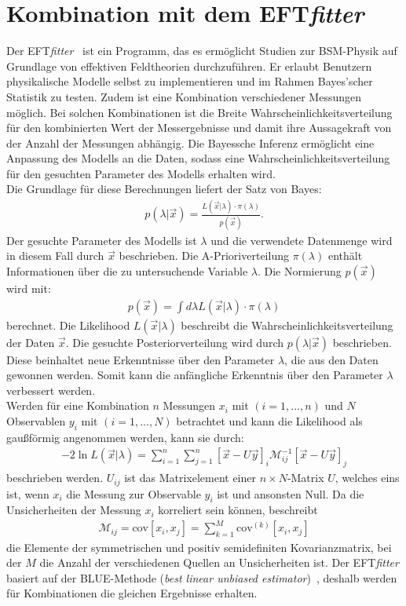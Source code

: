 \section{Kombination mit dem EFT\textit{fitter}}
Der EFT\textit{fitter}~\cite{Castro:2016jjv} ist ein Programm, das es ermöglicht Studien zur BSM-Physik auf Grundlage von effektiven Feldtheorien durchzuführen. Er erlaubt Benutzern physikalische Modelle selbst zu implementieren und im Rahmen Bayes'scher Statistik zu testen. Zudem ist eine Kombination verschiedener Messungen möglich. Bei solchen Kombinationen ist die Breite Wahrscheinlichkeitsverteilung für den kombinierten Wert der Messergebnisse und damit ihre Aussagekraft von der Anzahl der Messungen abhängig.
Die Bayessche Inferenz ermöglicht eine Anpassung des Modells an die Daten, sodass eine Wahrscheinlichkeitsverteilung für den gesuchten Parameter des Modells erhalten wird.\\
Die Grundlage für diese Berechnungen liefert der Satz von Bayes:
\begin{align}
  p(\lambda|\vec{x}) = \frac{L(\vec{x}|\lambda) \cdot \pi(\lambda)}{p(\vec{x})}.
\end{align}
Der gesuchte Parameter des Modells ist $\lambda$ und die verwendete Datenmenge wird in diesem Fall durch $\vec{x}$ beschrieben. Die A-Prioriverteilung $\pi(\lambda)$ enthält Informationen über die zu untersuchende Variable $\lambda$.
Die Normierung $p(\vec{x})$ wird mit:
\begin{align}
  p(\vec{x}) = \int d\lambda L(\vec{x}|\lambda) \cdot \pi(\lambda)
\end{align}
berechnet. Die Likelihood $L(\vec{x}|\lambda)$ beschreibt die Wahrscheinlichkeitsverteilung der Daten $\vec{x}$. Die gesuchte Posteriorverteilung wird durch $p(\lambda|\vec{x})$ beschrieben. Diese beinhaltet neue Erkenntnisse über den Parameter $\lambda$, die aus den Daten gewonnen werden. Somit kann die anfängliche Erkenntnis über den Parameter $\lambda$ verbessert werden.\\
Werden für eine Kombination $n$ Messungen $x_i$ mit $(i= 1,...,n)$ und $N$ Observablen $y_i$ mit $(i= 1,...,N)$ betrachtet und kann die Likelihood als gaußförmig angenommen werden, kann sie durch:
\begin{align}
  -2 \ln{L(\vec{x}|\lambda)} = \sum^{n}_{i=1} \sum^{n}_{j=1} \left[\vec{x} - U\vec{y}\right]_{i} \mathcal{M}_{ij}^{-1} \left[\vec{x} - U\vec{y}\right]_{j}
  \label{eqn:like}
\end{align}
beschrieben werden. $U_{ij}$ ist das Matrixelement einer $n \times N$-Matrix $U$, welches eins ist, wenn $x_i$ die Messung zur Observable $y_i$ ist und ansonsten Null. Da die Unsicherheiten der Messung $x_i$ korreliert sein können, beschreibt
\begin{align}
  \mathcal{M}_{ij} = \text{cov}[x_i, x_j] = \sum_{k=1}^{M} \text{cov}^{(k)}[x_i, x_j]
\end{align}
die Elemente der symmetrischen und positiv semidefiniten Kovarianzmatrix, bei der $M$ die Anzahl der verschiedenen Quellen an Unsicherheiten ist. Der EFT\textit{fitter} basiert auf der BLUE-Methode (\textit{best linear unbiased estimator})~\cite{LYONS1988110}, deshalb werden für Kombinationen die gleichen Ergebnisse erhalten.


